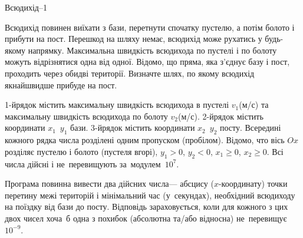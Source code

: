 ﻿\begin{problemAllDefault}{Всюдихід--1}

Всюдихід повинен виїхати з бази, перетнути спочатку пустелю, а потім болото і прибути на пост. Перешкод на шляху немає, всюдихід може рухатись у будь-якому напрямку. Максимальна швидкість всюдихода по пустелі і по болоту можуть відрізнятися одна від одної. Відомо, що пряма, яка з'єднує базу і пост, проходить через обидві території. Визначте шлях, по якому всюдихід якнайшвидше прибуде на пост.

\InputFile
\mbox{1-й}\nolinebreak[2] рядок містить максимальну швидкість всюдихода в пустелі $v_1$\nolinebreak[3] (м/с) та максимальну швидкість всюдихода по болоту $v_2$\nolinebreak[3] (м/с). 
\mbox{2-й}\nolinebreak[2] рядок містить координати $x_1$~$y_1$ бази. 
\mbox{3-й}\nolinebreak[2] рядок містить координати $x_2$~$y_2$ посту.
Всередині кожного рядка числа розділені одним пропуском (пробілом).
Відомо, что вісь $Ox$ розділяє пустелю і болото (пустеля вгорі), $y_1{>}0$, $y_2{<}0$, $x_1{\geqslant}0$, $x_2{\geqslant}0$. Всі числа дійсні і не~перевищують за~модулем~$10^7$.

\OutputFile
Програма повинна вивести два дійсних числа\nolinebreak[3] --- абсцису ($x$-координату) точки перетину межі територій і мінімальний час (у~секундах), необхідний всюдиходу на поїздку від бази до посту. Відповідь зараховується, коли для кожного з цих двох чисел хоча~б одна з похибок (абсолютна та/або відносна) не~перевищує $10^{-9}$.

\Examples

\begin{example}
%
%
\end{example}

\end{problemAllDefault}

